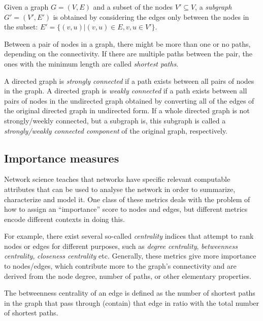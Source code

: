 \begin{definition}
Given a graph $G=(V, E)$ and a subset of the nodes $V' \subseteq V$, a \emph{subgraph} $G'=(V', E')$ is obtained by considering the edges only between the nodes in the subset: $E' = \{(v, u)|(v, u) \in E, v,u \in V'\}$.
\end{definition}

\begin{definition}
Between a pair of nodes in a graph, there might be more than one or no paths, depending on the connectivity. If there are multiple paths between the pair, the ones with the minimum length are called \emph{shortest paths}.
\end{definition}

\begin{definition}
A directed graph is \emph{strongly connected} if a path exists between all pairs of nodes in the graph. A directed graph is \emph{weakly connected} if a path exists between all pairs of nodes in the undirected graph obtained by converting all of the edges of the original directed graph in undirected form. If a whole directed graph is not strongly/weekly connected, but a subgraph is, this subgraph is called a \emph{strongly/weakly connected component} of the original graph, respectively.
\end{definition}

\subsection{Importance measures}

Network science teaches that networks have specific relevant computable attributes that can be used to analyse the network in order to summarize, characterize and model it. One class of these metrics deals with the problem of how to assign an \enquote{importance} score to nodes and edges, but different metrics encode different contexts in doing this.

For example, there exist several so-called \emph{centrality} indices that attempt to rank nodes or edges for different purposes, such as \emph{degree centrality}, \emph{betweenness centrality}, \emph{closeness centrality} etc. Generally, these metrics give more importance to nodes/edges, which contribute more to the graph's connectivity and are derived from the node degree, number of paths, or other elementary properties.

\begin{definition}
The betweenness centrality of an edge is defined as the number of shortest paths in the graph that pass through (contain) that edge in ratio with the total number of shortest paths.
\end{definition}

